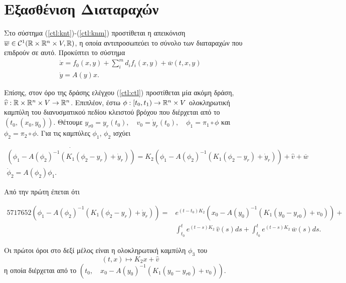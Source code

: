 \section{Εξασθένιση Διαταραχών}

\noindent Στο σύστημα (\ref{ctl:knt})-(\ref{ctl:knm}) προστίθεται η απεικόνιση
$\overline{w} \in \mathcal{C}^{1}(\mathbb{R}\times\mathbb{R}^{n}\times V,\mathbb{R})$, η οποία 
αντιπροσωπεύει το σύνολο των διαταραχών που επιδρούν σε αυτό. Προκύπτει το 
σύστημα
\begin{gather}
    \dot{x} = f_{0}(x, y) + \sum_{i}^{m}{d_{i}f_{i}}(x,y) + \overline{w}(t,x,y)
    \label{ctl:knt_} \\
    \dot{y} = A(y)x.
    \label{ctl:knm_}   
\end{gather}

Επίσης, στον όρο της δράσης ελέγχου (\ref{ctl:ctl}) προστίθεται μία ακόμη δράση,
$\widehat{v}: \mathbb{R}\times\mathbb{R}^{n}\times V \rightarrow \mathbb{R}^{n}$. Επιπλέον,
έστω $\phi:[t_0,t_1)\rightarrow \mathbb{R}^{n} \times V$ ολοκληρωτική καμπύλη του
διανυσματικού πεδίου κλειστού βρόχου που διέρχεται από το $\left(t_0,(x_0,y_0)
\right)$. Θέτουμε $y_{r0} = y_r(t_0),\quad v_0 = \dot{y}_r(t_0),\quad \phi_1 = 
\pi_1 \circ \phi$ και $\phi_2 = \pi_2 \circ \phi$. Για τις καμπύλες $\phi_1$, 
$\phi_2$ ισχύει

\begin{gather}
    \dot{\left(\phi_1 - A(\phi_2)^{-1}\left(K_1(\phi_2 - y_r) +\dot{y}_r\right)
    \right)} = K_2\left(\phi_1 - A(\phi_2)^{-1}\left(K_1(\phi_2 - y_r) + 
    \dot{y}_r\right)\right) + \widehat{v} + \overline{w}
    \label{ctl:dphi1}\\
    \dot{\phi}_2 = A(\phi_2)\phi_1.
    \label{ctl:dphi2}
\end{gather}

Από την πρώτη έπεται ότι

\begin{equation}
    \begin{split}5717652
        \left(\phi_1 - A(\phi_2)^{-1}\left(K_1(\phi_2 - y_r) +\dot{y}_r\right)
        \right) =& e^{(t-t_0)K_2} \left(x_0 - A(y_0)^{-1}\left(K_1(y_0 - y_{r0})
         + v_0\right)\right) +\\&\int_{t_0}^{t}{e^{(t-s)K_2}\,\widehat{v}(s)} ds
         + \int_{t_0}^{t}{e^{(t-s)K_2}\,\overline{w}(s)} ds.
    \end{split}
    \label{ctl:phi1}
\end{equation}

Οι πρώτοι όροι στο δεξί μέλος είναι η ολοκληρωτική καμπύλη $\phi_3$ του
\begin{equation*}
    (t,x) \mapsto K_2x+\widehat{v}
\end{equation*}
η οποία διέρχεται από το $\left(t_0,\quad x_0 - A(y_0)^{-1}\left(K_1 (y_0 - 
y_{r0})+v_0\right)\right).$

